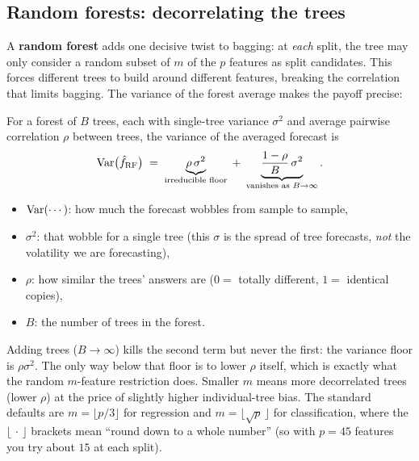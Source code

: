 \subsection{Random forests: decorrelating the trees}

A \textbf{random forest} adds one decisive twist to bagging: at \emph{each}
split, the tree may only consider a random subset of $m$ of the $p$ features
as split candidates.  This forces different trees to build around different
features, breaking the correlation that limits bagging.  The variance of the
forest average makes the payoff precise:

\begin{keyidea}
For a forest of $B$ trees, each with single-tree variance $\sigma^2$ and
average pairwise correlation $\rho$ between trees, the variance of the
averaged forecast is
\begin{equation}\label{eq:trees:rf_variance}
  \operatorname{Var}\!\big(\hat{f}_{\text{RF}}\big)
  \;=\;
  \underbrace{\rho\,\sigma^2}_{\text{irreducible floor}}
  \;+\;
  \underbrace{\frac{1-\rho}{B}\,\sigma^2}_{\text{vanishes as }B\to\infty}.
\end{equation}
\begin{itemize}[leftmargin=1.8em]
  \item $\operatorname{Var}(\cdots)$: how much the forecast wobbles from sample to sample,
  \item $\sigma^2$: that wobble for a single tree (this $\sigma$ is the
        spread of tree forecasts, \emph{not} the volatility we are
        forecasting),
  \item $\rho$: how similar the trees' answers are
        ($0=$ totally different, $1=$ identical copies),
  \item $B$: the number of trees in the forest.
\end{itemize}
Adding trees ($B\to\infty$) kills the second term but never the first: the
variance floor is $\rho\sigma^2$.  The only way below that floor is to lower
$\rho$ itself, which is exactly what the random $m$-feature restriction does.
Smaller $m$ means more decorrelated trees (lower $\rho$) at the price of
slightly higher individual-tree bias.  The standard defaults are
$m = \lfloor p/3 \rfloor$ for regression and $m = \lfloor \sqrt{p}\,\rfloor$
for classification, where the $\lfloor\,\cdot\,\rfloor$ brackets mean ``round
down to a whole number'' (so with $p = 45$ features you try about $15$ at
each split).
\end{keyidea}

